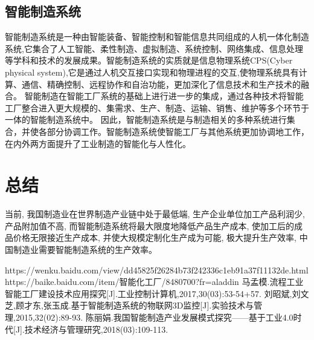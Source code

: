 \documentclass{article}
\begin{document}
  \subsection{智能制造系统}
  智能制造系统是一种由智能装备、智能控制和智能信息共同组成的人机一体化制造系统,它集合了人工智能、柔性制造、虚拟制造、系统控制、网络集成、信息处理等学科和技术的发展成果。\cite{c5}智能制造系统的实质就是信息物理系统CPS(Cyber physical system),它是通过人机交互接口实现和物理进程的交互,使物理系统具有计算、通信、精确控制、远程协作和自治功能，更加深化了信息技术和生产技术的融合。
智能制造在智能工厂系统的基础上进行进一步的集成，通过各种技术将智能工厂整合进入更大规模的、集需求、生产、制造、运输、销售、维护等多个环节于一体的智能制造系统中。
因此，智能制造系统是与制造相关的多种系统进行集合，并使各部分协调工作。智能制造系统使智能工厂与其他系统更加协调地工作，在内外两方面提升了工业制造的智能化与人性化。
  \section{总结}
  当前, 我国制造业在世界制造产业链中处于最低端, 生产企业单位加工产品利润少, 产品附加值不高, 而智能制造系统将最大限度地降低产品生产成本, 使加工后的成品价格无限接近生产成本, 并使大规模定制化生产成为可能, 极大提升生产效率, 中国制造业需要智能制造系统的生产效率。\cite{c6}
  \begin{thebibliography}{3}
  	https://wenku.baidu.com/view/dd45825f26284b73f242336c1eb91a37f11132de.html
  	https://baike.baidu.com/item/智能化工厂/8480700?fr=aladdin
  	马孟模.流程工业智能工厂建设技术应用探究[J].工业控制计算机,2017,30(03):53-54+57.
  	刘昭斌,刘文芝,顾才东,张玉成.基于智能制造系统的物联网3D监控[J].实验技术与管理,2015,32(02):89-93.
  	陈丽娟.我国智能制造产业发展模式探究——基于工业4.0时代[J].技术经济与管理研究,2018(03):109-113.
  \end{thebibliography}
\end{document}
